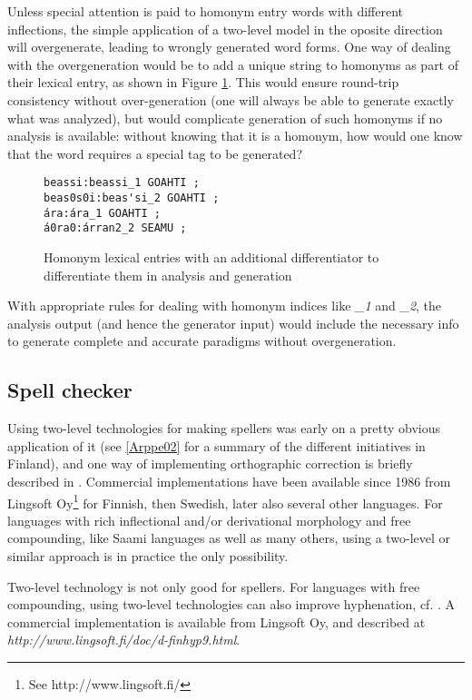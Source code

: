 \documentclass[a4paper,english]{article}
\begin{document}
Unless special attention is paid to homonym entry words with different inflections, the simple application of a two-level model in the oposite direction will overgenerate, leading to wrongly generated word forms. One way of dealing with the overgeneration would be to add a unique string to homonyms as part of their lexical entry, as shown in Figure \ref{homonlex}. This would ensure round-trip consistency without over-generation (one will always be able to generate exactly what was analyzed), but would complicate generation of such homonyms if no analysis is available: without knowing that it is a homonym, how would one know that the word requires a special tag to be generated?

\begin{figure}[htb]
\begin{center}
\begin{verbatim}
beassi:beassi_1 GOAHTI ;
beas0s0i:beas'si_2 GOAHTI ;
ára:ára_1 GOAHTI ;
á0ra0:árran2_2 SEAMU ;
\end{verbatim}
\end{center}
\caption{Homonym lexical entries with an additional differentiator to differentiate them in analysis and generation}
\label{homonlex}
\end{figure}

With appropriate rules for dealing with homonym indices like \textit{\_1} and \textit{\_2}, the analysis output (and hence the generator input) would include the necessary info to generate complete and accurate paradigms without overgeneration.

\subsection{Spell checker}\label{spell}

Using two-level technologies for making spellers was early on a pretty obvious application of it (see \ref{Arppe02} for a summary of the different initiatives in Finland), and one way of implementing orthographic correction is briefly described in \cite{Beesley03}. Commercial implementations have been available since 1986 from Lingsoft Oy\footnote{See http://www.lingsoft.fi/} for Finnish, then Swedish, later also several other languages. For languages with rich inflectional and/or derivational morphology and free compounding, like Saami languages as well as many others, using a two-level or similar approach is in practice the only possibility.

Two-level technology is not only good for spellers. For languages with free compounding, using two-level technologies can also improve hyphenation, cf. \cite{Karlsson85}. A commercial implementation is available from Lingsoft Oy, and described at \textit{http://www.lingsoft.fi/doc/d-finhyp9.html}.
\end{document}
